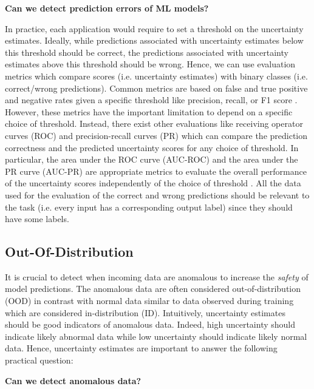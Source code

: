 \begin{center}
    \textbf{Can we detect prediction errors of ML models?}
\end{center}

In practice, each application would require to set a threshold on the uncertainty estimates. Ideally, while predictions associated with uncertainty estimates below this threshold should be correct, the predictions associated with uncertainty estimates above this threshold should be wrong. Hence, we can use evaluation metrics which compare scores (i.e. uncertainty estimates) with binary classes (i.e. correct/wrong predictions). Common metrics are based on false and true positive and negative rates given a specific threshold like precision, recall, or F1 score \cite{powers2011evaluation}. However, these metrics have the important limitation to depend on a specific choice of threshold. Instead, there exist other evaluations like receiving operator curves (ROC) and precision-recall curves (PR) which can compare the prediction correctness and the predicted uncertainty scores for any choice of threshold. In particular, the area under the ROC curve (AUC-ROC) and the area under the PR curve (AUC-PR) are appropriate metrics to evaluate the overall performance of the uncertainty scores independently of the choice of threshold \cite{apr_auroc}. All the data used for the evaluation of the correct and wrong predictions should be relevant to the task (i.e. every input has a corresponding output label) since they should have some labels.

\subsection{Out-Of-Distribution}

It is crucial to detect when incoming data are anomalous to increase the \emph{safety} of model predictions. The anomalous data are often considered out-of-distribution (OOD) in contrast with normal data similar to data observed during training which are considered in-distribution (ID). Intuitively, uncertainty estimates should be good indicators of anomalous data. Indeed, high uncertainty should indicate likely abnormal data while low uncertainty should indicate likely normal data. Hence, uncertainty estimates are important to answer the following practical question:

\begin{center}
    \textbf{Can we detect anomalous data?}
\end{center}

